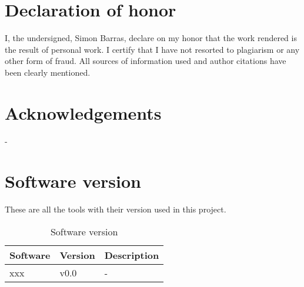 \chapter{Declaration of honor}
\label{ch:honour}
I, the undersigned, Simon Barras, declare on my honor that the work rendered is the result of 
personal work. I certify that I have not resorted to plagiarism or any other form of fraud.
All sources of information used and author citations have been clearly mentioned.



\chapter{Acknowledgements}
\label{ch:remerciement}
-

\chapter{Software version}
\label{ch:software}
These are all the tools with their version used in this project.

\begin{table}[ht]
    \centering
    \begin{tabular}{|l|p{3cm}|l|}
    \hline
    \multicolumn{1}{|c|}{\textbf{Software}} & \multicolumn{1}{c|}{\textbf{Version}} & \multicolumn{1}{c|}{\textbf{Description}} \\ \hline
    xxx                     & v0.0                                  & -        \\ \hline
    \end{tabular}
    \caption{Software version}
    \label{tab:softwareVersion}
\end{table}